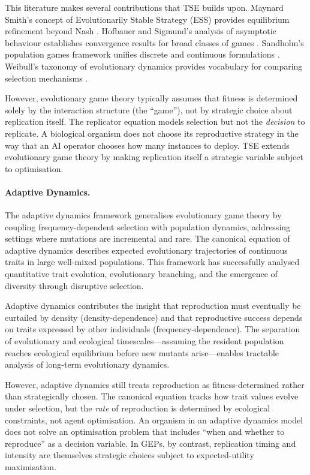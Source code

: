 \documentclass[12pt]{article}
\begin{document}
This literature makes several contributions that TSE builds upon. Maynard Smith's concept of Evolutionarily Stable Strategy (ESS) provides equilibrium refinement beyond Nash \citep{maynardsmith1982}. Hofbauer and Sigmund's analysis of asymptotic behaviour establishes convergence results for broad classes of games \citep{hofbauer1998}. Sandholm's population games framework unifies discrete and continuous formulations \citep{sandholm2010}. Weibull's taxonomy of evolutionary dynamics provides vocabulary for comparing selection mechanisms \citep{weibull1995}.

However, evolutionary game theory typically assumes that fitness is determined solely by the interaction structure (the ``game''), not by strategic choice about replication itself. The replicator equation models selection but not the \emph{decision} to replicate. A biological organism does not choose its reproductive strategy in the way that an AI operator chooses how many instances to deploy. TSE extends evolutionary game theory by making replication itself a strategic variable subject to optimisation.

\paragraph{Adaptive Dynamics.}
The adaptive dynamics framework \citep{dieckmann1996, metz1996, geritz1998} generalises evolutionary game theory by coupling frequency-dependent selection with population dynamics, addressing settings where mutations are incremental and rare. The canonical equation of adaptive dynamics describes expected evolutionary trajectories of continuous traits in large well-mixed populations. This framework has successfully analysed quantitative trait evolution, evolutionary branching, and the emergence of diversity through disruptive selection.

Adaptive dynamics contributes the insight that reproduction must eventually be curtailed by density (density-dependence) and that reproductive success depends on traits expressed by other individuals (frequency-dependence). The separation of evolutionary and ecological timescales---assuming the resident population reaches ecological equilibrium before new mutants arise---enables tractable analysis of long-term evolutionary dynamics.

However, adaptive dynamics still treats reproduction as fitness-determined rather than strategically chosen. The canonical equation tracks how trait values evolve under selection, but the \emph{rate} of reproduction is determined by ecological constraints, not agent optimisation. An organism in an adaptive dynamics model does not solve an optimisation problem that includes ``when and whether to reproduce'' as a decision variable. In GEPs, by contrast, replication timing and intensity are themselves strategic choices subject to expected-utility maximisation.
\end{document}
